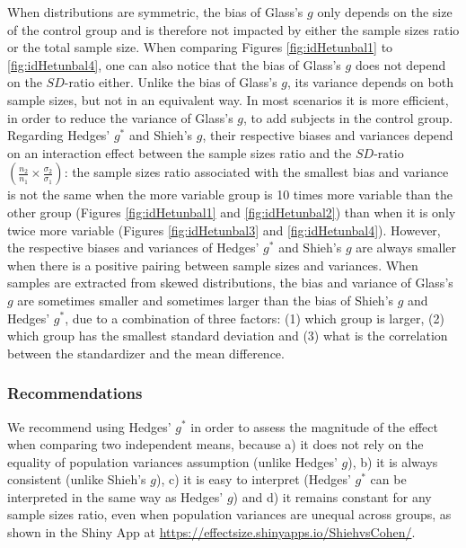 \documentclass[
  12pt,
  french,
]{article}
\begin{document}
When distributions are symmetric, the bias of Glass's \(g\) only depends
on the size of the control group and is therefore not impacted by either
the sample sizes ratio or the total sample size. When comparing Figures
\ref{fig:idHetunbal1} to \ref{fig:idHetunbal4}, one can also notice that
the bias of Glass's \(g\) does not depend on the \(SD\)-ratio either.
Unlike the bias of Glass's \(g\), its variance depends on both sample
sizes, but not in an equivalent way. In most scenarios it is more
efficient, in order to reduce the variance of Glass's \(g\), to add
subjects in the control group. Regarding Hedges' \(g^*\) and Shieh's
\(g\), their respective biases and variances depend on an interaction
effect between the sample sizes ratio and the \(SD\)-ratio
\(\left( \frac{n_2}{n_1} \times \frac{\sigma_2}{\sigma_1} \right)\): the
sample sizes ratio associated with the smallest bias and variance is not
the same when the more variable group is 10 times more variable than the
other group (Figures \ref{fig:idHetunbal1} and \ref{fig:idHetunbal2})
than when it is only twice more variable (Figures \ref{fig:idHetunbal3}
and \ref{fig:idHetunbal4}). However, the respective biases and variances
of Hedges' \(g^*\) and Shieh's \(g\) are always smaller when there is a
positive pairing between sample sizes and variances. When samples are
extracted from skewed distributions, the bias and variance of Glass's
\(g\) are sometimes smaller and sometimes larger than the bias of
Shieh's \(g\) and Hedges' \(g^*\), due to a combination of three
factors: (1) which group is larger, (2) which group has the smallest
standard deviation and (3) what is the correlation between the
standardizer and the mean difference.

\hypertarget{recommendations}{%
\subsubsection{Recommendations}\label{recommendations}}

We recommend using Hedges' \(g^*\) in order to assess the magnitude of
the effect when comparing two independent means, because a) it does not
rely on the equality of population variances assumption (unlike Hedges'
\(g\)), b) it is always consistent (unlike Shieh's \(g\)), c) it is easy
to interpret (Hedges' \(g^*\) can be interpreted in the same way as
Hedges' \(g\)) and d) it remains constant for any sample sizes ratio,
even when population variances are unequal across groups, as shown in
the Shiny App at \url{https://effectsize.shinyapps.io/ShiehvsCohen/}.
\end{document}
